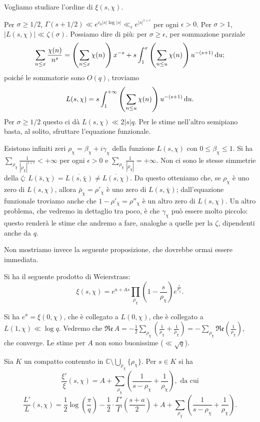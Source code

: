 Vogliamo studiare l'ordine di $\xi(s,\chi)$.

Per $\sigma \ge 1/2$, $\Gamma(s+1/2) \ll e^{c_0|s|\log{|s|}} \ll_{\epsilon} e^{|s|^{1+\epsilon}}$ per ogni $\epsilon>0$. Per $\sigma>1$, $|L(s,\chi)| \ll \zeta(\sigma)$. Possiamo dire di più: per $\sigma \ge \epsilon$, per sommazione parziale
$$\sum_{n \le x} \frac{\chi(n)}{n^s}=\left(\sum_{n \le x}\chi(n)\right)x^{-s}+s\int_1^x\left(\sum_{n \le u}\chi(n)\right)u^{-(s+1)}\mathop{}\!\mathrm{d} u;$$
poiché le sommatorie sono $O(q)$, troviamo
$$L(s,\chi)=s\int_1^{+\infty} \left(\sum_{n \le u}\chi(n)\right)u^{-(s+1)}\mathop{}\!\mathrm{d} u.$$
Per $\sigma \ge 1/2$ questo ci dà $L(s,\chi) \ll 2|s|q$. Per le stime nell'altro semipiano basta, al solito, sfruttare l'equazione funzionale.

Esistono infiniti zeri $\rho_\chi=\beta_\chi+i\gamma_\chi$ della funzione $L(s,\chi)$ con $0 \le \beta_\chi \le 1$. Si ha $\displaystyle \sum_{\rho_\chi} \frac{1}{|\rho_\chi|^{1+\epsilon}}<+\infty$ per ogni $\epsilon>0$ e $\displaystyle \sum_{\rho_\chi} \frac{1}{|\rho_\chi|}=+\infty$.
Non ci sono le stesse simmetrie della $\zeta$: $L(\bar{s},\chi)=\overline{L(s,\bar{\chi})}\not=\overline{L(s,\chi)}$. Da questo otteniamo che, se $\rho_\chi$ è uno zero di $L(s,\chi)$, allora $\bar{\rho}_\chi=\rho'_{\bar{\chi}}$ è uno zero di $L(s,\bar{\chi})$; dall'equazione funzionale troviamo anche che $1-\rho'_{\bar{\chi}}=\rho''_\chi$ è un altro zero di $L(s,\chi)$.
Un altro problema, che vedremo in dettaglio tra poco, è che $\gamma_\chi$ può essere molto piccolo: questo renderà le stime che andremo a fare, analoghe a quelle per la $\zeta$, dipendenti anche da $q$.

Non mostriamo invece la seguente proposizione, che dovrebbe ormai essere immediata.

\begin{prop}
  Si ha il seguente prodotto di Weierstrass:
  $$\xi(s,\chi)=e^{a+As}\prod_{\rho_\chi}\left(1-\frac{s}{\rho_\chi}\right)e^{\frac{s}{\rho_\chi}}.$$
\end{prop}

Si ha $e^a=\xi(0,\chi)$, che è collegato a $L(0,\chi)$, che è collegato a $L(1,\chi) \ll \log{q}$. Vedremo che $\displaystyle \mathfrak{Re}\,A=-\frac{1}{2}\sum_{\rho_\chi}\left(\frac{1}{\rho_\chi}+\frac{1}{\bar{\rho}_\chi}\right)=-\sum_{\rho_\chi} \mathfrak{Re}\left(\frac{1}{\rho_\chi}\right)$, che converge. Le stime per $A$ non sono buonissime ($\ll \sqrt{q}$).

\begin{cor} \label{derlogxielle}
  Sia $K$ un compatto contenuto in $\mathbb{C} \setminus \displaystyle \bigcup_{\rho_\chi} \{\rho_\chi\}$. Per $s \in K$ si ha
  $$\frac{\xi'}{\xi}(s,\chi)=A+\sum_{\rho_\chi} \left(\frac{1}{s-\rho_\chi}+\frac{1}{\rho_\chi}\right), \text{ da cui}$$
  $$\frac{L'}{L}(s,\chi)=\frac{1}{2}\log\left(\frac{\pi}{q}\right)-\frac{1}{2}\cdot\frac{\Gamma'}{\Gamma}\left(\frac{s+a}{2}\right)+A+\sum_{\rho_\chi}\left(\frac{1}{s-\rho_\chi}+\frac{1}{\rho_\chi}\right).$$
\end{cor}

